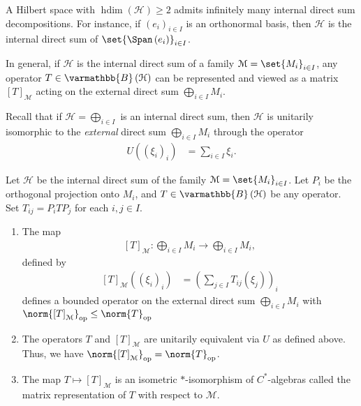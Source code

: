 \documentclass[10pt]{mypackage}
\renewcommand*{\mathbb}[1]{\varmathbb{#1}}
\DeclareMathOperator{\hdim}{hdim}
\newcommand{\B}{\mathbb{B}}
\begin{document}
A Hilbert space with $\hdim\left(\mathcal{H}\right) \geq 2$ admits infinitely many internal direct sum decompositions. For instance, if $\left(e_i\right)_{i\in I}$ is an orthonormal basis, then $\mathcal{H}$ is the internal direct sum of $\set{\Span\left(e_i\right)}_{i\in I}$.\newline

In general, if $\mathcal{H}$ is the internal direct sum of a family $\mathcal{M} = \set{M_i}_{i\in I}$, any operator $T\in \B\left(\mathcal{H}\right)$ can be represented and viewed as a matrix $\left[T\right]_{\mathcal{M}}$ acting on the external direct sum $\bigoplus_{i\in I}M_i$.\newline

Recall that if $\mathcal{H} = \bigoplus_{i\in I}$ is an internal direct sum, then $\mathcal{H}$ is unitarily isomorphic to the \textit{external} direct sum $\bigoplus_{i\in I}M_i$ through the operator
\begin{align*}
  U\left(\left(\xi_i\right)_i\right) &= \sum_{i\in I}\xi_i.
\end{align*}
\begin{proposition}
  Let $\mathcal{H}$ be the internal direct sum of the family $\mathcal{M} = \set{M_i}_{i\in I}$. Let $P_i$ be the orthogonal projection onto $M_i$, and $T\in \B\left(\mathcal{H}\right)$ be any operator. Set $T_{ij} = P_iTP_j$ for each $i,j\in I$.
  \begin{enumerate}[(1)]
    \item The map
      \begin{align*}
        \left[T\right]_{\mathcal{M}}: \bigoplus_{i\in I}M_i \rightarrow \bigoplus_{i\in I} M_i,
      \end{align*}
      defined by
      \begin{align*}
        \left[T\right]_{\mathcal{M}}\left(\left(\xi_i\right)_i\right) &= \left(\sum_{j\in I}T_{ij}\left(\xi_j\right)\right)_i
      \end{align*}
      defines a bounded operator on the external direct sum $\bigoplus_{i\in I}M_i$ with $\norm{\left[T\right]_{\mathcal{M}}}_{\text{op}} \leq \norm{T}_{\text{op}}$
    \item The operators $T$ and $\left[T\right]_{\mathcal{M}}$ are unitarily equivalent via $U$ as defined above. Thus, we have $\norm{\left[T\right]_{\mathcal{M}}}_{\text{op}} = \norm{T}_{\text{op}}$.
    \item The map $T \mapsto \left[T\right]_{\mathcal{M}}$ is an isometric $\ast$-isomorphism of $C^{\ast}$-algebras called the matrix representation of $T$ with respect to $\mathcal{M}$.
  \end{enumerate}
\end{proposition}
\end{document}

